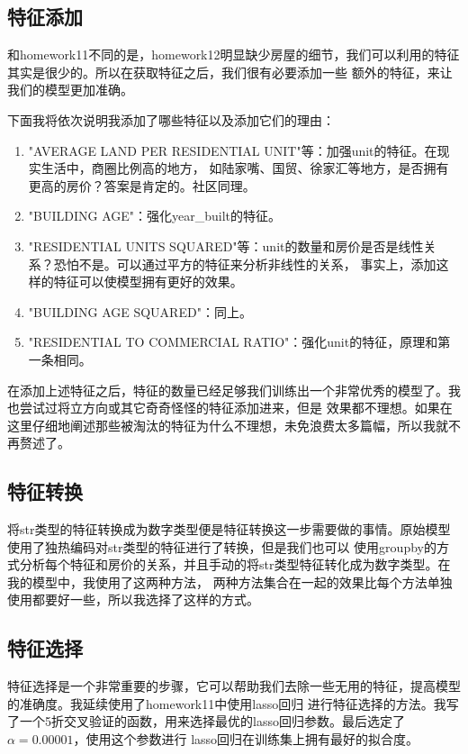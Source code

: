 \documentclass{ctexart}
\begin{document}
    \subsection{特征添加}
    和homework11不同的是，homework12明显缺少房屋的细节，我们可以利用的特征其实是很少的。所以在获取特征之后，我们很有必要添加一些
    额外的特征，来让我们的模型更加准确。\par    
    下面我将依次说明我添加了哪些特征以及添加它们的理由：
    \begin{enumerate}
        \item "AVERAGE LAND PER RESIDENTIAL UNIT"等：加强unit的特征。在现实生活中，商圈比例高的地方，
        如陆家嘴、国贸、徐家汇等地方，是否拥有更高的房价？答案是肯定的。社区同理。
        \item "BUILDING AGE"：强化year\_built的特征。
        \item "RESIDENTIAL UNITS SQUARED"等：unit的数量和房价是否是线性关系？恐怕不是。可以通过平方的特征来分析非线性的关系，
        事实上，添加这样的特征可以使模型拥有更好的效果。
        \item "BUILDING AGE SQUARED"：同上。
        \item "RESIDENTIAL TO COMMERCIAL RATIO"：强化unit的特征，原理和第一条相同。
    \end{enumerate}
    \par
    在添加上述特征之后，特征的数量已经足够我们训练出一个非常优秀的模型了。我也尝试过将立方向或其它奇奇怪怪的特征添加进来，但是
    效果都不理想。如果在这里仔细地阐述那些被淘汰的特征为什么不理想，未免浪费太多篇幅，所以我就不再赘述了。\par

    \subsection{特征转换}
    将str类型的特征转换成为数字类型便是特征转换这一步需要做的事情。原始模型使用了独热编码对str类型的特征进行了转换，但是我们也可以
    使用groupby的方式分析每个特征和房价的关系，并且手动的将str类型特征转化成为数字类型。在我的模型中，我使用了这两种方法，
    两种方法集合在一起的效果比每个方法单独使用都要好一些，所以我选择了这样的方式。\par

    \subsection{特征选择}
    特征选择是一个非常重要的步骤，它可以帮助我们去除一些无用的特征，提高模型的准确度。我延续使用了homework11中使用lasso回归
    进行特征选择的方法。我写了一个5折交叉验证的函数，用来选择最优的lasso回归参数。最后选定了$\alpha=0.00001$，使用这个参数进行
    lasso回归在训练集上拥有最好的拟合度。\par
\end{document}

